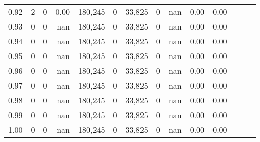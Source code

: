 \begin{tabular}{rrrrrrrrrrrrrr}
0.92 &      2 &      0 &  0.00 &  180,245 &        0 &  33,825 &       0 &   nan &  0.00 &      0.00 \\
0.93 &      0 &      0 &   nan &  180,245 &        0 &  33,825 &       0 &   nan &  0.00 &      0.00 \\
0.94 &      0 &      0 &   nan &  180,245 &        0 &  33,825 &       0 &   nan &  0.00 &      0.00 \\
0.95 &      0 &      0 &   nan &  180,245 &        0 &  33,825 &       0 &   nan &  0.00 &      0.00 \\
0.96 &      0 &      0 &   nan &  180,245 &        0 &  33,825 &       0 &   nan &  0.00 &      0.00 \\
0.97 &      0 &      0 &   nan &  180,245 &        0 &  33,825 &       0 &   nan &  0.00 &      0.00 \\
0.98 &      0 &      0 &   nan &  180,245 &        0 &  33,825 &       0 &   nan &  0.00 &      0.00 \\
0.99 &      0 &      0 &   nan &  180,245 &        0 &  33,825 &       0 &   nan &  0.00 &      0.00 \\
1.00 &      0 &      0 &   nan &  180,245 &        0 &  33,825 &       0 &   nan &  0.00 &      0.00 \\
\bottomrule
\end{tabular}
